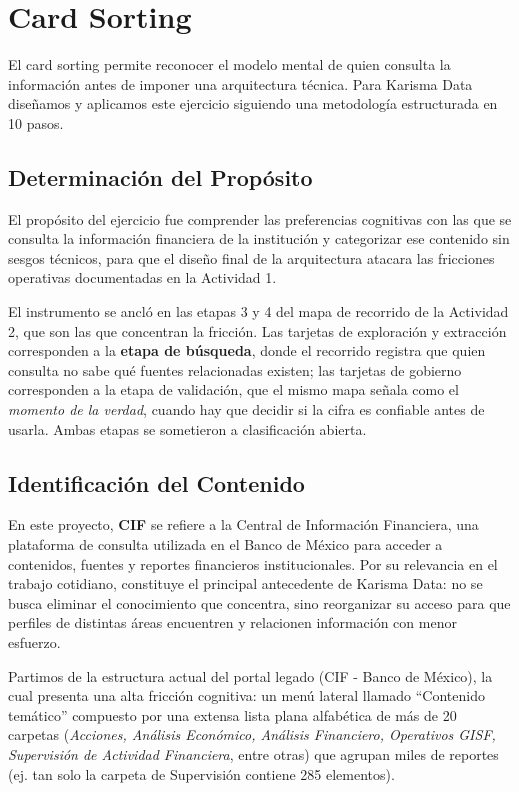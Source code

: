 \section{Card Sorting}\label{sec:cardsorting}

El card sorting permite reconocer el modelo mental de quien consulta la información antes de imponer una arquitectura técnica. Para Karisma Data diseñamos y aplicamos este ejercicio siguiendo una metodología estructurada en 10 pasos.

\subsection{Determinación del Propósito}
El propósito del ejercicio fue comprender las preferencias cognitivas con las que se consulta la información financiera de la institución y categorizar ese contenido sin sesgos técnicos, para que el diseño final de la arquitectura atacara las fricciones operativas documentadas en la Actividad 1.

El instrumento se ancló en las etapas 3 y 4 del mapa de recorrido de la Actividad 2, que son las que concentran la fricción. Las tarjetas de exploración y extracción corresponden a la \textbf{etapa de búsqueda}, donde el recorrido registra que quien consulta no sabe qué fuentes relacionadas existen; las tarjetas de gobierno corresponden a la etapa de validación, que el mismo mapa señala como el \textit{momento de la verdad}, cuando hay que decidir si la cifra es confiable antes de usarla. Ambas etapas se sometieron a clasificación abierta.

\subsection{Identificación del Contenido}
En este proyecto, \textbf{CIF} se refiere a la Central de Información Financiera, una plataforma de consulta utilizada en el Banco de México para acceder a contenidos, fuentes y reportes financieros institucionales. Por su relevancia en el trabajo cotidiano, constituye el principal antecedente de Karisma Data: no se busca eliminar el conocimiento que concentra, sino reorganizar su acceso para que perfiles de distintas áreas encuentren y relacionen información con menor esfuerzo.

Partimos de la estructura actual del portal legado (CIF - Banco de México), la cual presenta una alta fricción cognitiva: un menú lateral llamado ``Contenido temático'' compuesto por una extensa lista plana alfabética de más de 20 carpetas (\textit{Acciones, Análisis Económico, Análisis Financiero, Operativos GISF, Supervisión de Actividad Financiera}, entre otras) que agrupan miles de reportes (ej. tan solo la carpeta de Supervisión contiene 285 elementos).


